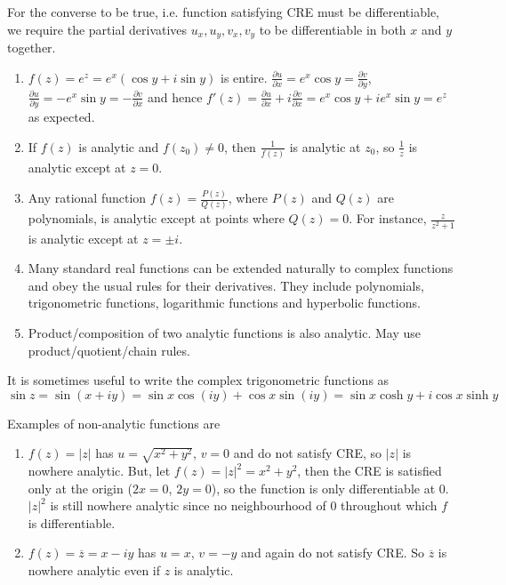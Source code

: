 \documentclass[a4paper]{article}
\begin{document}
\begin{remarks}
For the converse to be true, i.e. function satisfying CRE must be differentiable, we require the partial derivatives $u_x,u_y,v_x,v_y$ to be differentiable in both $x$ and $y$ together.
\end{remarks}
\begin{eg}\leavevmode
\begin{enumerate}
    \item $f(z)=e^z=e^x(\cos y+i\sin y)$ is entire. $\frac{\partial u}{\partial x}=e^x\cos y=\frac{\partial v}{\partial y}$, $\frac{\partial u}{\partial y}=-e^x\sin y=-\frac{\partial v}{\partial x}$ and hence $f'(z)=\frac{\partial u}{\partial x}+i\frac{\partial v}{\partial x}=e^x\cos y+ie^x\sin y=e^z$ as expected.
    \item If $f(z)$ is analytic and $f(z_0)\neq 0$, then $\frac{1}{f(z)}$ is analytic at $z_0$, so $\frac{1}{z}$ is analytic except at $z=0$.
    \item Any rational function $f(z)=\frac{P(z)}{Q(z)}$, where $P(z)$ and $Q(z)$ are polynomials, is analytic except at points where $Q(z)=0$. For instance, $\frac{z}{z^2+1}$ is analytic except at $z=\pm i$.
    \item Many standard real functions can be extended naturally to complex functions and obey the usual rules for their derivatives. They include polynomials, trigonometric functions, logarithmic functions and hyperbolic functions.
    \item Product/composition of two analytic functions is also analytic. May use product/quotient/chain rules.
\end{enumerate}
\end{eg}
\begin{remarks}
It is sometimes useful to write the complex trigonometric functions as
$$\sin z=\sin(x+iy)=\sin x\cos(iy)+\cos x\sin(iy)=\sin x\cosh y+i\cos x\sinh y$$
\end{remarks}
\begin{eg}
Examples of non-analytic functions are
\begin{enumerate}
    \item $f(z)=|z|$ has $u=\sqrt{x^2+y^2}$, $v=0$ and do not satisfy CRE, so $|z|$ is nowhere analytic. But, let $f(z)=|z|^2=x^2+y^2$, then the CRE is satisfied only at the origin ($2x=0$, $2y=0$), so the function is only differentiable at 0. $|z|^2$ is still nowhere analytic since no neighbourhood of 0 throughout which $f$ is differentiable.
    \item $f(z)=\overline{z}=x-iy$ has $u=x$, $v=-y$ and again do not satisfy CRE. So $\overline{z}$ is nowhere analytic even if $z$ is analytic.
\end{enumerate}
\end{eg}
\end{document}
